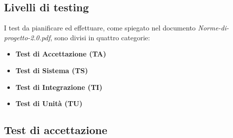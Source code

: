 \documentclass[a4paper,11pt]{article}
\begin{document}
\subsection{Livelli di testing}
I test da pianificare ed effettuare, come spiegato nel documento \textit{Norme-di-progetto-2.0.pdf}, sono divisi in quattro categorie:
\begin{itemize}
\item \textbf{Test di Accettazione (TA)}
\item \textbf{Test di Sistema (TS)}
\item \textbf{Test di Integrazione (TI)}
\item \textbf{Test di Unità (TU)}
\end{itemize}
\subsection{Test di accettazione}
\end{document}

